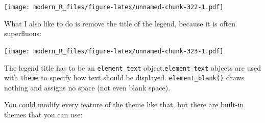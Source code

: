\documentclass[]{gitbook}
\newenvironment{Shaded}{\begin{snugshade}}{\end{snugshade}}
\newcommand{\DataTypeTok}[1]{\textcolor[rgb]{0.13,0.29,0.53}{#1}}
\newcommand{\KeywordTok}[1]{\textcolor[rgb]{0.13,0.29,0.53}{\textbf{#1}}}
\newcommand{\NormalTok}[1]{#1}
\newcommand{\OperatorTok}[1]{\textcolor[rgb]{0.81,0.36,0.00}{\textbf{#1}}}
\newcommand{\StringTok}[1]{\textcolor[rgb]{0.31,0.60,0.02}{#1}}
\theoremstyle{definition}
\theoremstyle{definition}
\theoremstyle{definition}
\theoremstyle{remark}
\begin{document}
\texttt{[image: modern\_R\_files/figure-latex/unnamed-chunk-322-1.pdf]}

What I also like to do is remove the title of the legend, because it is
often superfluous:

\begin{Shaded}
\end{Shaded}

\texttt{[image: modern\_R\_files/figure-latex/unnamed-chunk-323-1.pdf]}

The legend title has to be an \texttt{element\_text}
object.\texttt{element\_text} objects are used with \texttt{theme} to
specify how text should be displayed. \texttt{element\_blank()} draws
nothing and assigns no space (not even blank space).

You could modify every feature of the theme like that, but there are
built-in themes that you can use:
\end{document}

